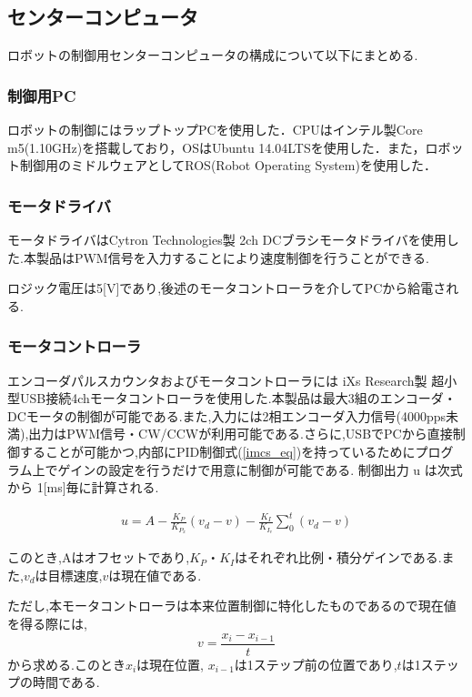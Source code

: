 \subsection{センターコンピュータ}
\par ロボットの制御用センターコンピュータの構成について以下にまとめる.
\subsubsection{制御用PC}
\par ロボットの制御にはラップトップPCを使用した．CPUはインテル製Core m5(1.10GHz)を搭載しており，OSはUbuntu 14.04LTSを使用した．また，ロボット制御用のミドルウェアとしてROS(Robot Operating System)を使用した．
\subsubsection{モータドライバ}

\par モータドライバはCytron Technologies製 2ch DCブラシモータドライバを使用した.本製品はPWM信号を入力することにより速度制御を行うことができる.
\par ロジック電圧は5[V]であり,後述のモータコントローラを介してPCから給電される.

\subsubsection{モータコントローラ}
\par エンコーダパルスカウンタおよびモータコントローラには iXs Research製 超小型USB接続4chモータコントローラを使用した.本製品は最大3組のエンコーダ・DCモータの制御が可能である.また,入力には2相エンコーダ入力信号(4000pps未満),出力はPWM信号・CW/CCWが利用可能である.さらに,USBでPCから直接制御することが可能かつ,内部にPID制御式(\ref{imcs_eq})を持っているためにプログラム上でゲインの設定を行うだけで用意に制御が可能である.
制御出力 u は次式から 1[ms]毎に計算される.

\begin{eqnarray}
	u=A-\frac{K_P}{K_{P_x}}(v_d - v)%
	-\frac{K_I}{K_{I_v}}\sum_0^t (v_d-v)
\label{imcs_eq}
\end{eqnarray}

このとき,Aはオフセットであり,$K_P・K_I$はそれぞれ比例・積分ゲインである.また,$v_d$は目標速度,$v$は現在値である.\\
\par ただし,本モータコントローラは本来位置制御に特化したものであるので現在値を得る際には,
\begin{equation}
	v = \frac{x_i - x_{i-1}}{t}
\end{equation}
から求める.このとき$x_i$は現在位置, $x_{i-1}$は1ステップ前の位置であり,$t$は1ステップの時間である.

